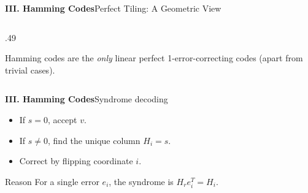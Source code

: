 \begin{frame}{\textbf{III. Hamming Codes}}{Perfect Tiling: A Geometric View}
\begin{columns}[T,onlytextwidth]
\begin{column}{.49\textwidth}
    \medskip

    \medskip
    Hamming codes are the \emph{only} linear perfect 1-error-correcting codes (apart from trivial cases).
  \end{column}
\end{columns}
\end{frame}

\begin{frame}{\textbf{III. Hamming Codes}}{Syndrome decoding}
\small
{}
\begin{itemize}
  \item If $s=0$, accept $v$.
  \item If $s\ne0$, find the unique column $H_i=s$.
  \item Correct by flipping coordinate $i$.
\end{itemize}
\begin{block}{Reason}
For a single error $e_i$, the syndrome is $H_re_i^T=H_i$.
\end{block}
\end{frame}

